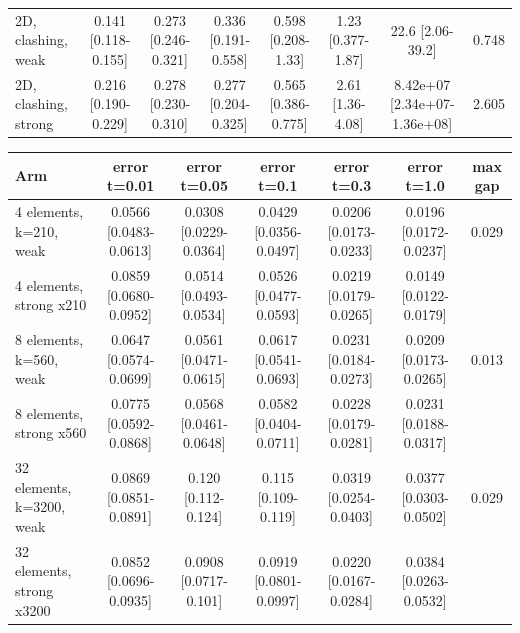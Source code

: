 \begin{tabular}{lccccccc}
2D, clashing, weak & 0.141 {\scriptsize[0.118-0.155]} & 0.273 {\scriptsize[0.246-0.321]} & 0.336 {\scriptsize[0.191-0.558]} & 0.598 {\scriptsize[0.208-1.33]} & 1.23 {\scriptsize[0.377-1.87]} & 22.6 {\scriptsize[2.06-39.2]} & 0.748 \\
2D, clashing, strong & 0.216 {\scriptsize[0.190-0.229]} & 0.278 {\scriptsize[0.230-0.310]} & 0.277 {\scriptsize[0.204-0.325]} & 0.565 {\scriptsize[0.386-0.775]} & 2.61 {\scriptsize[1.36-4.08]} & 8.42e+07 {\scriptsize[2.34e+07-1.36e+08]} & 2.605 \\
\bottomrule
\end{tabular}

\begin{tabular}{lcccccc}
\toprule
Arm & error t=0.01 & error t=0.05 & error t=0.1 & error t=0.3 & error t=1.0 & max gap \\
\midrule
4 elements, k=210, weak & 0.0566 {\scriptsize[0.0483-0.0613]} & 0.0308 {\scriptsize[0.0229-0.0364]} & 0.0429 {\scriptsize[0.0356-0.0497]} & 0.0206 {\scriptsize[0.0173-0.0233]} & 0.0196 {\scriptsize[0.0172-0.0237]} & 0.029 \\
4 elements, strong x210 & 0.0859 {\scriptsize[0.0680-0.0952]} & 0.0514 {\scriptsize[0.0493-0.0534]} & 0.0526 {\scriptsize[0.0477-0.0593]} & 0.0219 {\scriptsize[0.0179-0.0265]} & 0.0149 {\scriptsize[0.0122-0.0179]} &  \\
8 elements, k=560, weak & 0.0647 {\scriptsize[0.0574-0.0699]} & 0.0561 {\scriptsize[0.0471-0.0615]} & 0.0617 {\scriptsize[0.0541-0.0693]} & 0.0231 {\scriptsize[0.0184-0.0273]} & 0.0209 {\scriptsize[0.0173-0.0265]} & 0.013 \\
8 elements, strong x560 & 0.0775 {\scriptsize[0.0592-0.0868]} & 0.0568 {\scriptsize[0.0461-0.0648]} & 0.0582 {\scriptsize[0.0404-0.0711]} & 0.0228 {\scriptsize[0.0179-0.0281]} & 0.0231 {\scriptsize[0.0188-0.0317]} &  \\
32 elements, k=3200, weak & 0.0869 {\scriptsize[0.0851-0.0891]} & 0.120 {\scriptsize[0.112-0.124]} & 0.115 {\scriptsize[0.109-0.119]} & 0.0319 {\scriptsize[0.0254-0.0403]} & 0.0377 {\scriptsize[0.0303-0.0502]} & 0.029 \\
32 elements, strong x3200 & 0.0852 {\scriptsize[0.0696-0.0935]} & 0.0908 {\scriptsize[0.0717-0.101]} & 0.0919 {\scriptsize[0.0801-0.0997]} & 0.0220 {\scriptsize[0.0167-0.0284]} & 0.0384 {\scriptsize[0.0263-0.0532]} &  \\
\bottomrule
\end{tabular}

